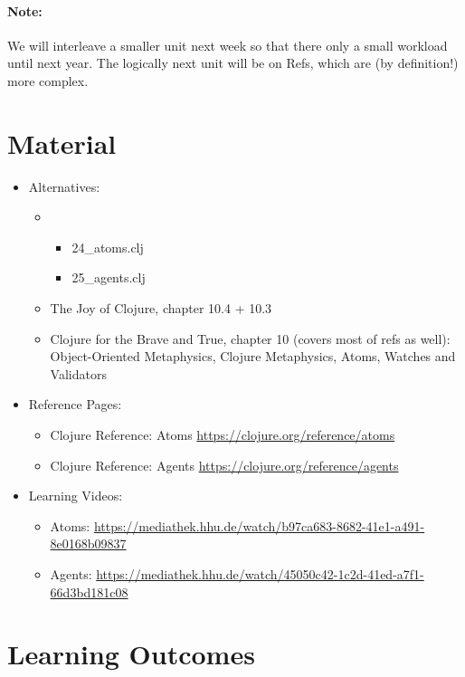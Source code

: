 \documentclass[11pt,a4paper]{article}
\begin{document}
 
\paragraph{Note:} 
We will interleave a smaller unit next week so that there only a small workload until next year.
The logically next unit will be on Refs, which are (by definition!) more complex.

\section{Material} 

\begin{itemize}
    \item Alternatives:
        \begin{itemize}
            \item \begin{itemize}
                \item 24\_atoms.clj
                \item 25\_agents.clj
            \end{itemize}
            \item The Joy of Clojure, chapter 10.4 + 10.3
            \item Clojure for the Brave and True, chapter 10 (covers most of refs as well): Object-Oriented Metaphysics, Clojure Metaphysics, Atoms, Watches and Validators
        \end{itemize}
    \item Reference Pages:
        \begin{itemize}
    \item Clojure Reference: Atoms \url{https://clojure.org/reference/atoms}
    \item Clojure Reference: Agents \url{https://clojure.org/reference/agents}
        \end{itemize}
    \item Learning Videos:
        \begin{itemize}
    \item Atoms: \url{https://mediathek.hhu.de/watch/b97ca683-8682-41e1-a491-8e0168b09837}
    \item Agents: \url{https://mediathek.hhu.de/watch/45050c42-1c2d-41ed-a7f1-66d3bd181c08}
        \end{itemize}
\end{itemize}


\section{Learning Outcomes}
\end{document}
